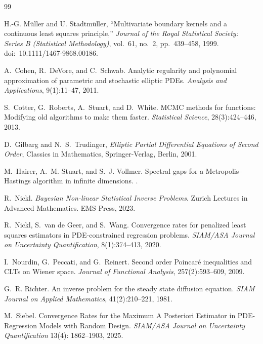 \documentclass{article}
\numberwithin{equation}{section}
\theoremstyle{definition}
\begin{document}
\begin{thebibliography}{99}

H.-G. M{\"u}ller and U. Stadtm{\"u}ller,
``Multivariate boundary kernels and a continuous least squares principle,''
\emph{Journal of the Royal Statistical Society: Series B (Statistical Methodology)},
vol.~61, no.~2, pp.~439--458, 1999.
doi:~10.1111/1467-9868.00186.

A.~Cohen, R.~DeVore, and C.~Schwab.
\newblock Analytic regularity and polynomial approximation of parametric and
stochastic elliptic PDEs.
\newblock \emph{Analysis and Applications}, 9(1):11--47, 2011.

S.~Cotter, G.~Roberts, A.~Stuart, and D.~White.
\newblock MCMC methods for functions: Modifying old algorithms to make them
faster.
\newblock \emph{Statistical Science}, 28(3):424--446, 2013.

D.~Gilbarg and N.~S.~Trudinger,
\emph{Elliptic Partial Differential Equations of Second Order},
Classics in Mathematics,
Springer-Verlag, Berlin, 2001.

M.~Hairer, A.~M. Stuart, and S.~J. Vollmer.
\newblock Spectral gaps for a Metropolis--Hastings algorithm in infinite
dimensions.
.

R.~Nickl.
\newblock \emph{Bayesian Non-linear Statistical Inverse Problems}.
\newblock Zurich Lectures in Advanced Mathematics. EMS Press, 2023.

R.~Nickl, S.~van de Geer, and S.~Wang.
\newblock Convergence rates for penalized least squares estimators in
PDE-constrained regression problems.
\newblock \emph{SIAM/ASA Journal on Uncertainty Quantification},
8(1):374--413, 2020.

I.~Nourdin, G.~Peccati, and G.~Reinert.
\newblock Second order Poincar\'e inequalities and CLTs on Wiener space.
\newblock \emph{Journal of Functional Analysis}, 257(2):593--609, 2009.

G.~R. Richter.
\newblock An inverse problem for the steady state diffusion equation.
\newblock \emph{SIAM Journal on Applied Mathematics}, 41(2):210--221, 1981.

M.~Siebel.
\newblock Convergence Rates for the Maximum A Posteriori Estimator in PDE-Regression Models with Random Design.
\newblock \emph{SIAM/ASA Journal on Uncertainty Quantification} 13(4): 1862--1903, 2025.



\end{thebibliography}
\end{document}
